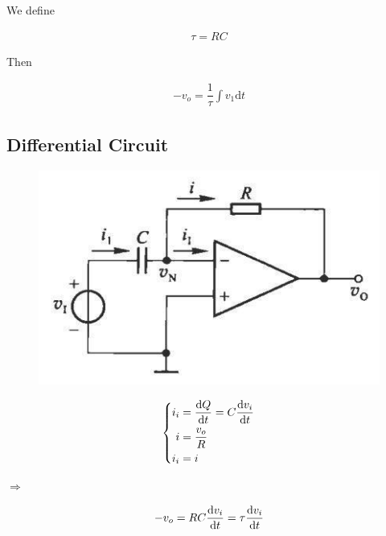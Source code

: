 We define

\begin{equation*}
  \begin{aligned}
    \tau = RC
  \end{aligned}
\end{equation*}

Then

\begin{equation*}
  \begin{aligned}
    - v_o = \dfrac{1}{\tau} \int v_{1} \mathrm{d} t
  \end{aligned}
\end{equation*}

\subsection{Differential Circuit}

\begin{figure}[H]
  \centering
  \includegraphics[width=0.7\linewidth]{figures/differential-circuit}
\end{figure}

\begin{equation*}
  \left\{
  \begin{aligned}
    i_i &= \dfrac{\mathop{}\!\mathrm{d} Q}{\mathop{}\!\mathrm{d} t} = C \dfrac{\mathop{}\!\mathrm{d} v_i}{\mathop{}\!\mathrm{d} t}  \\
    i &= \dfrac{v_o}{R} \\
    i_i &= i
  \end{aligned}
  \right.
\end{equation*}

$\Rightarrow$

\begin{equation*}
  \begin{aligned}
    - v_o = R C \dfrac{\mathrm{d} v_i}{\mathrm{d} t} = \tau \dfrac{\mathop{}\!\mathrm{d} v_i}{\mathop{}\!\mathrm{d} t} 
  \end{aligned}
\end{equation*}

